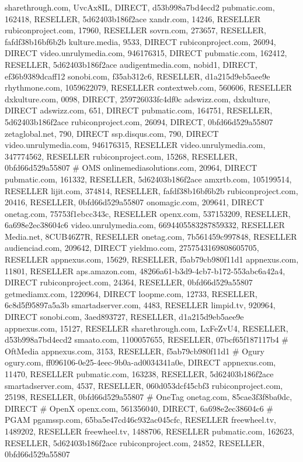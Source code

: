 sharethrough.com, UvcAx8IL, DIRECT, d53b998a7bd4ecd2
pubmatic.com, 162418, RESELLER, 5d62403b186f2ace
xandr.com, 14246, RESELLER
rubiconproject.com, 17960, RESELLER
sovrn.com, 273657, RESELLER, fafdf38b16bf6b2b
kulture.media, 9533, DIRECT
rubiconproject.com, 26094, DIRECT
video.unrulymedia.com, 946176315, DIRECT
pubmatic.com, 162412, RESELLER, 5d62403b186f2ace
audigentmedia.com, nobid1, DIRECT, ef36b9389dcaff12
sonobi.com, f35ab312c6, RESELLER, d1a215d9eb5aee9e
rhythmone.com, 1059622079, RESELLER
contextweb.com, 560606, RESELLER
dxkulture.com, 0098, DIRECT, 259726033fc4df0c
adswizz.com, dxkulture, DIRECT
adswizz.com, 651, DIRECT
pubmatic.com, 164751, RESELLER, 5d62403b186f2ace
rubiconproject.com, 26094, DIRECT, 0bfd66d529a55807
zetaglobal.net, 790, DIRECT
ssp.disqus.com, 790, DIRECT
video.unrulymedia.com, 946176315, RESELLER
video.unrulymedia.com, 347774562, RESELLER
rubiconproject.com, 15268, RESELLER, 0bfd66d529a55807
# OMS
onlinemediasolutions.com, 20964, DIRECT
pubmatic.com, 161332, RESELLER, 5d62403b186f2ace
amxrtb.com, 105199514, RESELLER
lijit.com, 374814, RESELLER, fafdf38b16bf6b2b
rubiconproject.com, 20416, RESELLER, 0bfd66d529a55807
onomagic.com, 209641, DIRECT
onetag.com, 75753f1ebcc343c, RESELLER
openx.com, 537153209, RESELLER, 6a698e2ec38604c6
video.unrulymedia.com, 6694405583287859332, RESELLER
Media.net, 8CUB46Z7R, RESELLER
onetag.com, 7b561459c997848, RESELLER
audienciad.com, 209642, DIRECT
yieldmo.com, 2757543169808605705, RESELLER
appnexus.com, 15629, RESELLER, f5ab79cb980f11d1
appnexus.com, 11801, RESELLER
aps.amazon.com, 48266a61-b3d9-4cb7-b172-553abc6a42a4, DIRECT
rubiconproject.com, 24364, RESELLER, 0bfd66d529a55807
getmediamx.com, 1220964, DIRECT
loopme.com, 12733, RESELLER, 6c8d5f95897a5a3b
smartadserver.com, 4483, RESELLER
limpid.tv, 920964, DIRECT
sonobi.com, 3aed893727, RESELLER, d1a215d9eb5aee9e
appnexus.com, 15127, RESELLER
sharethrough.com, LxFeZvU4, RESELLER, d53b998a7bd4ecd2
smaato.com, 1100057655, RESELLER, 07bcf65f187117b4
# OftMedia
appnexus.com, 3153, RESELLER, f5ab79cb980f11d1
# Ogury
ogury.com, ff096106-0e25-4eec-9b0a-ad0034341a0e, DIRECT
appnexus.com, 11470, RESELLER
pubmatic.com, 163238, RESELLER, 5d62403b186f2ace
smartadserver.com, 4537, RESELLER, 060d053dcf45cbf3
rubiconproject.com, 25198, RESELLER, 0bfd66d529a55807
# OneTag
onetag.com, 85cae3f3f8ba0dc, DIRECT
# OpenX
openx.com, 561356040, DIRECT, 6a698e2ec38604c6
# PGAM
pgamssp.com, 65ba5e47cd46c932ac045cfc, RESELLER
freewheel.tv, 1489202, RESELLER
freewheel.tv, 1488706, RESELLER
pubmatic.com, 162623, RESELLER, 5d62403b186f2ace
rubiconproject.com, 24852, RESELLER, 0bfd66d529a55807
